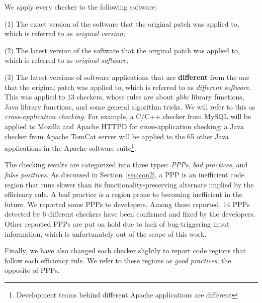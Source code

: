 We apply every checker to the following software: 

(1) The exact version of the software that the original patch was applied to, 
which is referred to as {\it original version}; 

(2) The latest version of 
the software that the original patch was applied to, which is referred to as 
{\it original software}; 

(3) The latest versions of 
software applications that are {\bf different} from the one that the original
patch was applied to, which is referred to as {\it different software}. 
This was applied to 13 checkers, whose rules are about {\it glibc} library
functions, Java library functions, and some general algorithm tricks. 
We will refer to this as {\it cross-application checking}.
For example, a C/C++ checker from MySQL will be applied to
Mozilla and Apache HTTPD for cross-application checking; a Java checker
from Apache TomCat server will be applied to the 65 other Java applications
in the Apache software suite\footnote{Development teams
behind different Apache applications are different}.



The checking results are categorized into three types: 
{\it PPPs}, {\it bad practices}, and {\it false positives}. 
As discussed in Section~\ref{sec:con2}, a PPP is an inefficient code region that
runs slower than its functionality-preserving alternate implied by
the efficiency rule. A bad practice is a region prone to becoming
inefficient in the future.
We reported some PPPs to developers.
Among those reported, 14 PPPs detected by 6 different
checkers have been confirmed and fixed by the developers. 
Other reported PPPs are put on hold due to lack of
bug-triggering input information, which is unfortunately out of the 
scope of this work.

Finally, we have also changed each checker slightly to report
code regions that follow each efficiency rule. We refer to these regions as 
{\it good practices}, the opposite of PPPs. 

